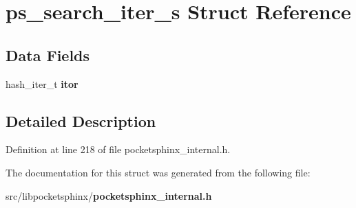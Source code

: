 \section{ps\-\_\-search\-\_\-iter\-\_\-s Struct Reference}
\label{structps__search__iter__s}
\subsection*{Data Fields}
\begin{DoxyCompactItemize}
\item 
hash\-\_\-iter\-\_\-t {\bfseries itor}\label{structps__search__iter__s_a08c98d4145043af325263a80020758f7}

\end{DoxyCompactItemize}


\subsection{Detailed Description}


Definition at line 218 of file pocketsphinx\-\_\-internal.\-h.



The documentation for this struct was generated from the following file\-:\begin{DoxyCompactItemize}
\item 
src/libpocketsphinx/{\bf pocketsphinx\-\_\-internal.\-h}\end{DoxyCompactItemize}
